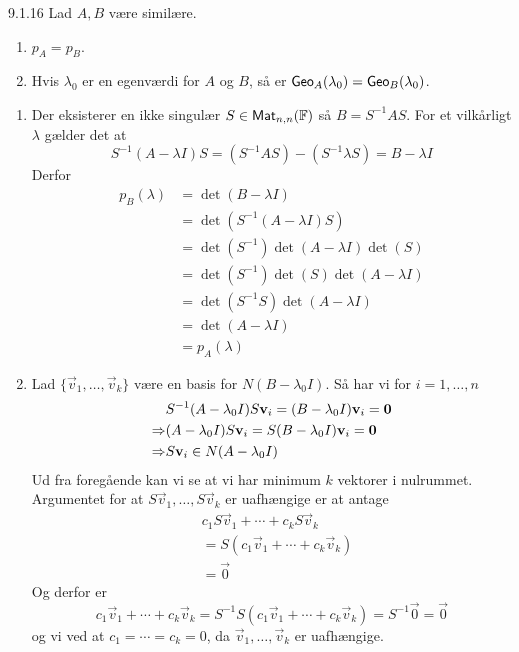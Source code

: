 \begin{lemma}{9.1.16}
	Lad $A, B$ være similære.
	\begin{enumerate}[1.]
		\item $\mathit{p}_A = \mathit{p}_B$.
		\item Hvis $\lambda_0$ er en egenværdi for $A$ og $B$, så er 
			$\textsf{Geo}_{A}(\lambda_0) = \textsf{Geo}_{B}(\lambda_0)$.
	\end{enumerate}
\end{lemma}

\begin{bevis}
	\begin{enumerate}[1.]
		\item Der eksisterer en ikke singulær $S \in \textsf{Mat}_{n,n}(\mathbb{F})$
			så $B = S^{-1}AS$. For et vilkårligt $\lambda$ gælder det at
			\[
				S^{-1}(A- \lambda I)S = (S^{-1}AS) - (S^{-1}\lambda S) = B - \lambda I
			\]
			Derfor
			\begin{align*}
				\mathit{p}_B(\lambda) &= \det(B-\lambda I)\\
				&= \det(S^{-1}(A-\lambda I)S)\\
				&= \det(S^{-1})\det(A-\lambda I)\det(S)\\
				&= \det(S^{-1})\det(S)\det(A - \lambda I)\\
				&= \det(S^{-1}S)\det(A - \lambda I)\\
				&= \det(A - \lambda I)\\
				&= \mathit{p}_A(\lambda)
			\end{align*}
		\item Lad $\{\vec{v}_1, \dotsc, \vec{v}_k\}$ være en basis for 
		$N(B-\lambda_0I)$. Så har vi for $i = 1,\dotsc,n$
		\begin{align*}
			&S^{-1}(A-\lambda_0I)S\mathbf{v}_i = (B-\lambda_0I)\mathbf{v}_i = \mathbf{0}\\
			\Rightarrow &(A-\lambda_0I)S\mathbf{v}_i = S(B-\lambda_0I)\mathbf{v}_i =  \mathbf{0}\\
			\Rightarrow & S\mathbf{v}_i \in N(A-\lambda_0I)
		\end{align*}
		Ud fra foregående kan vi se at vi har minimum $k$ vektorer i nulrummet.
		Argumentet for at $S\vec{v}_1,\dotsc,S\vec{v}_k$ er uafhængige er at 
		antage
		\begin{align*}
			&c_1S\vec{v}_1 + \dotsb + c_kS\vec{v}_k\\
			&= S(c_1\vec{v}_1 + \dotsb + c_k\vec{v}_k)\\
			&= \vec{0}
		\end{align*}
		Og derfor er
		\[
			c_1\vec{v}_1 + \dotsb + c_k\vec{v}_k =
			S^{-1}S(c_1\vec{v}_1 + \dotsb + c_k\vec{v}_k) =
			S^{-1}\vec{0} =
			\vec{0}
		\]
		og vi ved at $c_1= \dotsb =c_k = 0$, da $\vec{v}_1, \dotsc, \vec{v}_k$
		er uafhængige.


\end{enumerate}
\end{bevis}
